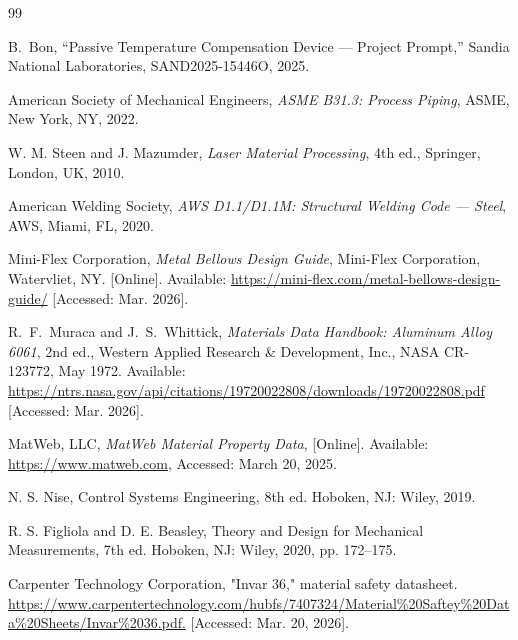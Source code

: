 \documentclass[12pt, letterpaper]{report}%
\begin{document}

%

\begin{thebibliography}{99}

    B.\ Bon,
    ``Passive Temperature Compensation Device --- Project Prompt,''
    Sandia National Laboratories, SAND2025-15446O, 2025.

    American Society of Mechanical Engineers, \textit{ASME B31.3: Process Piping}, 
    ASME, New York, NY, 2022.

    W. M. Steen and J. Mazumder, \textit{Laser Material Processing}, 4th ed., 
    Springer, London, UK, 2010.

    American Welding Society, \textit{AWS D1.1/D1.1M: Structural Welding Code --- Steel}, 
    AWS, Miami, FL, 2020.

    Mini-Flex Corporation, \textit{Metal Bellows Design Guide}, Mini-Flex Corporation, 
    Watervliet, NY. [Online]. Available: \url{https://mini-flex.com/metal-bellows-design-guide/}
    [Accessed: Mar. 2026].

    R.\ F.\ Muraca and J.\ S.\ Whittick,
    \textit{Materials Data Handbook: Aluminum Alloy 6061}, 2nd ed.,
    Western Applied Research \& Development, Inc.,
    NASA CR-123772, May 1972.
    Available: \url{https://ntrs.nasa.gov/api/citations/19720022808/downloads/19720022808.pdf}
    [Accessed: Mar. 2026].

    MatWeb, LLC, \textit{MatWeb Material Property Data}, 
    [Online]. Available: \url{https://www.matweb.com}, 
    Accessed: March 20, 2025.

    N. S. Nise, Control Systems Engineering, 8th ed. Hoboken, NJ: Wiley, 2019.

    R. S. Figliola and D. E. Beasley, Theory and Design for Mechanical Measurements, 7th ed. Hoboken, NJ: Wiley, 2020, pp. 172–175.

    Carpenter Technology Corporation, "Invar 36," material safety datasheet. \url{https://www.carpentertechnology.com/hubfs/7407324/Material%20Saftey%20Data%20Sheets/Invar%2036.pdf.}
    [Accessed: Mar. 20, 2026].
   

\end{thebibliography}
\end{document}
